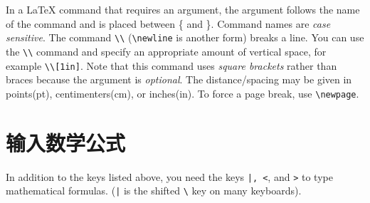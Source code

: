 In a \LaTeX \; command that requires an argument, the argument follows the name of the command and is placed between \{ and \}. Command names are \emph{case sensitive}. The command \verb+\\+ (\verb+\newline+ is another form) breaks a line. You can use the \verb+\\+ command and specify an appropriate amount of vertical space, for example \verb+\\[1in]+. Note that this command uses \emph{square brackets} rather than braces because the argument  is \emph{optional}. The distance/spacing may be given in points(pt), centimenters(cm), or inches(in).  To force a page break, use \verb+\newpage+.

\section{输入数学公式}
In addition to the keys listed above, you need the keys \verb+|, <+, and \verb+>+ to type mathematical formulas. (\verb+|+ is the shifted \verb+\+ key on many keyboards). \\

